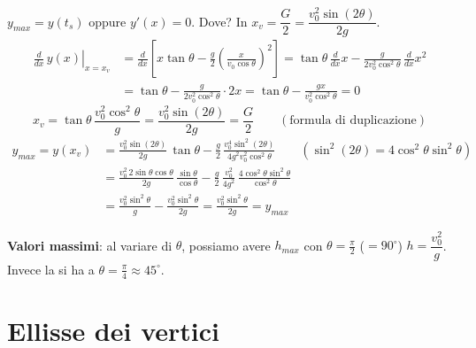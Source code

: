 \documentclass[11pt,a4paper,openany]{report}
\begin{document}
$y_{max} = y(t_s)$ oppure $y'(x) = 0$. Dove? In
$x_v = \dfrac{G}{2} = \dfrac{v_0^2\sin(2\theta)}{2g}$.
\begin{align*}
  \left.\frac{d}{dx}\,y(x)\right|_{x = x_v}
  &= \frac{d}{dx}\left[x\tan\theta - \frac{g}{2}\left(\frac{x}{v_0\cos\theta}\right)^2\right]
   = \tan\theta\,\frac{d}{dx}x - \frac{g}{2v_0^2\cos^2\theta}\,\frac{d}{dx}x^2 \\
  &= \tan\theta - \frac{g}{2v_0^2\cos^2\theta}\cdot 2x = \tan\theta - \frac{gx}{v_0^2\cos^2\theta} = 0
\end{align*}
\[
  x_v = \tan\theta\,\frac{v_0^2\cos^2\theta}{g} = \frac{v_0^2\sin(2\theta)}{2g} = \frac{G}{2}
  \qquad (\text{formula di duplicazione})
\]
\begin{align*}
  y_{max} = y(x_v)
  &= \frac{v_0^2\sin(2\theta)}{2g}\,\tan\theta - \frac{g}{2}\,\frac{v_0^4\sin^2(2\theta)}{4g^2v_0^2\cos^2\theta}
   \qquad (\sin^2(2\theta) = 4\cos^2\theta\sin^2\theta) \\
  &= \frac{v_0^2\,2\sin\theta\cos\theta}{2g}\,\frac{\sin\theta}{\cos\theta}
     - \frac{g}{2}\,\frac{v_0^2}{4g^2}\,\frac{4\cos^2\theta\sin^2\theta}{\cos^2\theta} \\
  &= \frac{v_0^2\sin^2\theta}{g} - \frac{v_0^2\sin^2\theta}{2g} = \frac{v_0^2\sin^2\theta}{2g} = y_{max}
\end{align*}

\begin{delucidazione}
\textbf{Valori massimi}: al variare di $\theta$, possiamo avere $h_{max}$ con
$\theta = \frac{\pi}{2}$ ($= 90^\circ$) \implica $h = \dfrac{v_0^2}{g}$.\\
Invece la  si ha a $\theta = \frac{\pi}{4} \approx 45^\circ$.
\end{delucidazione}

\section{Ellisse dei vertici}
\end{document}
